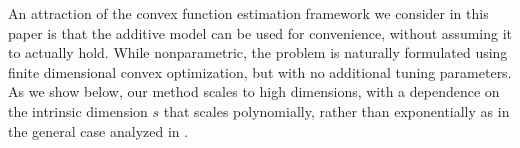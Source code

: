 An attraction of the convex function estimation framework we consider
in this paper is that the additive model can be used for convenience,
without assuming it to actually hold.  While nonparametric, the
problem is naturally formulated using finite dimensional convex
optimization, but with no additional tuning parameters.  As we show
below, our method scales to high dimensions, with a dependence on the
intrinsic dimension $s$ that scales polynomially, rather than
exponentially as in the general case analyzed in \cite{dalalyan:12}.



%
%
%
%
%
%
%
%


